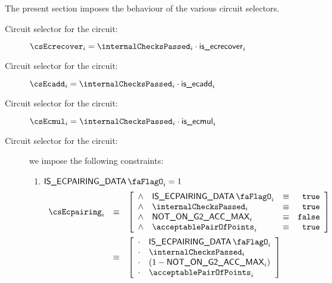 The present section imposes the behaviour of the various circuit selectors.
\begin{description}
    \item[Circuit selector for the  circuit:]
        $\csEcrecover_{i} = \internalChecksPassed_{i} \cdot \locIsEcrecover_{i}$
    \item[Circuit selector for the  circuit:]
        $\csEcadd_{i} = \internalChecksPassed_{i} \cdot \locIsEcadd_{i}$
    \item[Circuit selector for the  circuit:]
        $\csEcmul_{i} = \internalChecksPassed_{i} \cdot \locIsEcmul_{i}$
    \item[Circuit selector for the  circuit:]
    we impose the following constraints:
        \begin {enumerate}
            \item \If $\isEcpairingData_{i} = 1$ \Then
                \[
                    \begin{array}{lcl}
                        \csEcpairing_{i} & \equiv &
                        \left[ \begin{array}{clcr}
                            \wedge & \isEcpairingData_{i}         & \equiv & \texttt{true}  \\
                            \wedge & \internalChecksPassed_{i}   & \equiv & \texttt{true}  \\
                            \wedge & \notOnGTwoAccMax_{i}        & \equiv & \texttt{false} \\
                            \wedge & \acceptablePairOfPoints_{i} & \equiv & \texttt{true}  \\
                        \end{array} \right] \vspace{2mm} \\
                        & \equiv & 
                        \left[ \begin{array}{clcr}
                            \cdot & \isEcpairingData_{i}         \\
                            \cdot & \internalChecksPassed_{i}   \\
                            \cdot & (1 - \notOnGTwoAccMax_{i})  \\
                            \cdot & \acceptablePairOfPoints_{i} \\
                        \end{array} \right] \vspace{2mm} \\

\end{array}\]
\end{enumerate}
\end{description}
